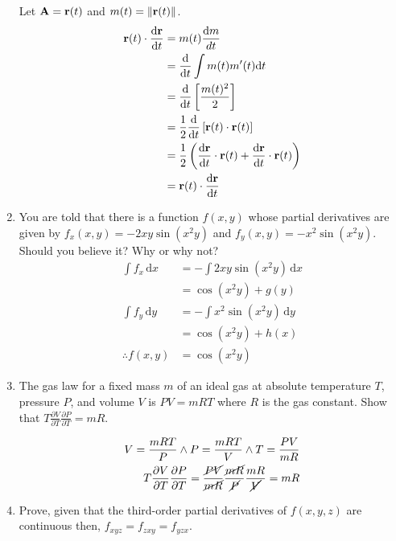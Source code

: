 \documentclass[11pt]{article}
\renewcommand{\vec}[1]{\ensuremath\mathbf{#1}}
\begin{document}
\begin{enumerate}
  Let \(\vec{A} = \vec{r}(t)\) and \(m(t) = \lVert \vec{r}(t) \rVert\).
  \begin{align*}
    \vec{r}(t) \cdot \frac{\mathrm{d}\vec{r}}{\mathrm{d}t}
    &= m(t) \frac{\mathrm{d}m}{dt} \\
    &= \frac{\mathrm{d}}{\mathrm{d}t} \int m(t)m'(t) \mathrm{d}t \\
    &= \frac{\mathrm{d}}{\mathrm{d}t} \left[ \frac{m(t)^2}{2} \right] \\
    &= \frac{1}{2} \frac{\mathrm{d}}{\mathrm{d}t} \left[ \vec{r}(t) \cdot
      \vec{r}(t) \right] \\
    &= \frac{1}{2} \left( \frac{\mathrm{d}\vec{r}}{\mathrm{d}t} \cdot
      \vec{r}(t) + \frac{\mathrm{d}\vec{r}}{\mathrm{d}t} \cdot \vec{r}(t) \right) \\
    &= \vec{r}(t) \cdot \frac{\mathrm{d}\vec{r}}{\mathrm{d}t}
  \end{align*}

\item You are told that there is a function \(f(x, y)\) whose partial
  derivatives are given by \(f_x(x, y) = -2xy \sin(x^2y)\) and \(f_y(x, y) =
  -x^2 \sin(x^2y)\). Should you believe it? Why or why not?
  \begin{align*}
    \int f_x \,\mathrm{d}x &= -\int 2xy \sin(x^2y) \,\mathrm{d}x \\
                           &= \cos(x^2y) + g(y) \\
    \int f_y \,\mathrm{d}y &= -\int x^2 \sin(x^2y) \,\mathrm{d}y \\
                           &= \cos(x^2y) + h(x) \\
    \therefore f(x, y) &= \cos(x^2y)
  \end{align*}

\item The gas law for a fixed mass \(m\) of an ideal gas at absolute
  temperature \(T\), pressure \(P\), and volume \(V\) is \(PV = mRT\) where
  \(R\) is the gas constant. Show that \(T \frac{\partial V}{\partial T}
  \frac{\partial P}{\partial T} = mR\).

  \begin{align*}
    V = \frac{mRT}{P} \land P = \frac{mRT}{V} \land T = \frac{PV}{mR} \\
    T \frac{\partial V}{\partial T}
    \frac{\partial P}{\partial T} = \frac{\cancel{PV}}{\cancel{mR}} \frac{\cancel{mR}}{\cancel{P}} \frac{mR}{\cancel{V}} = mR
  \end{align*}

\item Prove, given that the third-order partial derivatives of \(f(x, y,
  z)\) are continuous then, \(f_{xyz} = f_{zxy} = f_{yzx}\).


\end{enumerate}
\end{document}
